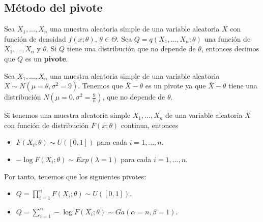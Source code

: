 \subsection{Método del pivote}

\begin{defi}
    Sea $X_1,...,X_n$ una muestra aleatoria simple de una variable aleatoria $X$ con función de densidad $f(x;\theta)$, $\theta \in \Theta$. Sea $Q = q(X_1,...,X_n;\theta)$ una función de $X_1,...,X_n$ y $\theta$. Si $Q$ tiene una distribución que no depende de $\theta$, entonces decimos que $Q$ es un \textbf{pivote}.
\end{defi}

\begin{ejemplo}
    Sea $X_1,...,X_n$ una muestra aleatoria simple de una variable aleatoria $X \sim N(\mu = \theta,\sigma^2 =9)$. Tenemos que $\overline{X} - \theta$ es un pivote ya que $\overline{X} - \theta$ tiene una distribución $N\left(\mu = 0, \sigma^2 = \frac{9}{n}\right)$, que no depende de $\theta$.
\end{ejemplo}

\begin{obs}
    Si tenemos una muestra aleatoria simple $X_1,...,X_n$ de una variable aleatoria $X$ con función de distribución $F(x;\theta)$ continua, entonces
    \begin{itemize}
        \item $F(X_i;\theta) \sim U([0,1])$ para cada $i= 1,...,n$.
        \item $-\log F(X_i;\theta) \sim Exp(\lambda = 1)$ para cada $i= 1,...,n$.
    \end{itemize}
    Por tanto, tenemos que los siguientes pivotes:
    \begin{itemize}
        \item $Q = \prod_{i=1}^{n} F(X_i;\theta) \sim U([0,1])$.
        \item $Q = \sum_{i=1}^{n} - \log F(X_i;\theta) \sim Ga(\alpha = n, \beta = 1)$.
    \end{itemize}
\end{obs}

